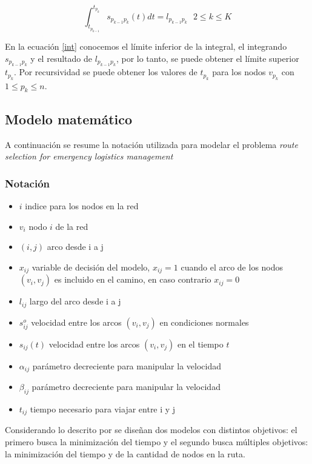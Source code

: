 \begin{equation}\label{int}
\int_{t_{p_{k-1}}}^{t_{p_k}} s_{p_{k-1}p_k}(t)dt = l_{p_{k-1}p_k} \text{  \(2 \leq k \leq  K\)}
 \end{equation}
 
En la ecuación \eqref{int} conocemos el límite inferior de la integral, el integrando $ s_{p_{k-1}p_k}$ y el resultado de $ l_{p_{k-1}p_k} $, por lo tanto, se puede obtener el límite superior $t_{p_k}$.
Por recursividad se puede obtener los valores de $t_{p_k}$ para los nodos $v_{p_k}$ con  $1\leq p_k \leq n$.

\subsection{Modelo matemático}
A continuación se resume la notación utilizada para modelar el problema \textit{route selection for emergency logistics management}
\subsubsection{Notación}
\begin{itemize}
	\item $i$ indice para los nodos en la red
	\item $v_i$ nodo $i$ de la red
 	\item $(i,j)$ arco desde i a j
	\item $x_{ij}$ variable de decisión del modelo, $x_{ij} = 1 $ cuando el arco de los nodos $(v_i,v_j)$ es incluido en el camino, en caso contrario $x_{ij} = 0$
	\item $l_{ij}$ largo del arco desde i a j
	\item $s^{o}_{ij}$  velocidad entre los arcos $(v_i, v_j)$ en condiciones normales
	\item $s_{ij}(t)$ velocidad entre los arcos $(v_i, v_j)$ en el tiempo $t$
	\item $\alpha_{ij}$ parámetro decreciente para manipular la velocidad           
	\item $\beta_{ij}$ parámetro decreciente para manipular la velocidad             
	\item $t_{ij}$ tiempo necesario para viajar entre i y j                      
\end{itemize}

Considerando lo descrito por \cite{southworth1991regional,cova2003network} se diseñan dos modelos con distintos objetivos: el primero busca la minimización del tiempo y el segundo busca múltiples objetivos: la minimización del tiempo y de la cantidad de nodos en la ruta.
